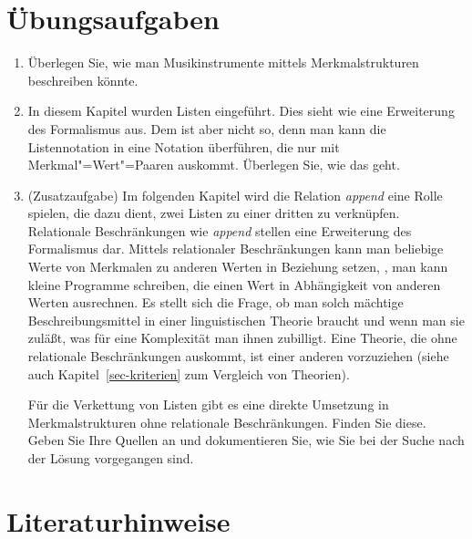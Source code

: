 \section*{Übungsaufgaben}


\begin{enumerate}
\item Überlegen Sie, wie man Musikinstrumente mittels Merkmalstrukturen beschreiben könnte.
\item\label{ua-liste} In diesem Kapitel wurden Listen eingeführt. Dies sieht wie eine Erweiterung des Formalismus
      aus. Dem ist aber nicht so, denn man kann die Listennotation in eine Notation überführen,
      die nur mit Merkmal"=Wert"=Paaren auskommt. Überlegen Sie, wie das geht.
\item (Zusatzaufgabe) Im folgenden Kapitel wird die Relation \emph{append} eine Rolle
      spielen, die dazu dient, zwei Listen zu einer dritten zu verknüpfen. Relationale
      Beschränkungen wie \emph{append} stellen eine Erweiterung des Formalismus dar. Mittels
      relationaler Beschränkungen kann man beliebige Werte von Merkmalen zu anderen Werten in
      Beziehung setzen, \dash, man kann kleine Programme schreiben, die einen Wert in Abhängigkeit von
      anderen Werten ausrechnen.  Es stellt sich die Frage, ob man solch mächtige Beschreibungsmittel in
      einer linguistischen Theorie braucht und wenn man sie zuläßt, was für eine Komplexität man
      ihnen zubilligt. Eine Theorie, die ohne relationale Beschränkungen auskommt, ist einer anderen
      vorzuziehen (siehe auch Kapitel~\ref{sec-kriterien} zum Vergleich von Theorien).

      Für die Verkettung von Listen gibt es eine direkte Umsetzung in Merkmalstrukturen ohne
      relationale Beschränkungen. Finden Sie diese. Geben Sie Ihre Quellen an und dokumentieren Sie,
      wie Sie bei der Suche nach der Lösung vorgegangen sind.
\end{enumerate}


\section*{Literaturhinweise}

